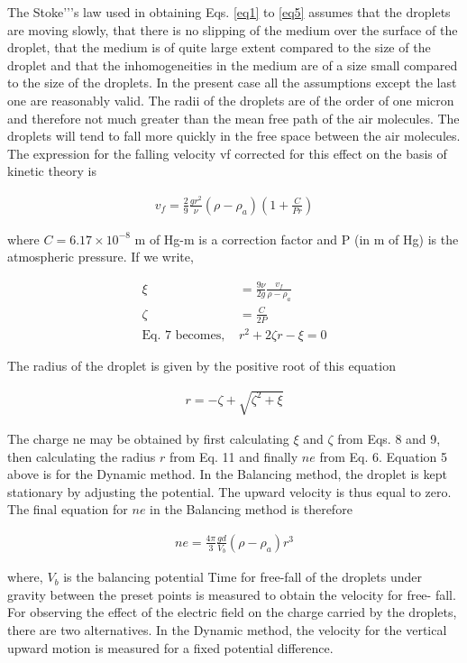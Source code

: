 The Stoke'’'s law used in obtaining Eqs. \ref{eq1} to \ref{eq5} assumes that the droplets are moving slowly, that there is no
slipping of the medium over the surface of the droplet,
that the medium is of quite large extent compared to
the size of the droplet and that the inhomogeneities in
the medium are of a size small compared to the size of
the droplets. In the present case all the assumptions
except the last one are reasonably valid. The radii of
the droplets are of the order of one micron and therefore not much greater than the mean free path of the air
molecules. The droplets will tend to fall more quickly in
the free space between the air molecules. The expression
for the falling velocity vf corrected for this effect on the
basis of kinetic theory is

\begin{align} \label{eq6}
    v_f = \frac{2}{9}\frac{gr^2}{\nu}(\rho-\rho_a)\left(1+\frac{C}{Pr}\right)
\end{align}
 
where $C = 6.17 \times 10^{-8}$ m of Hg-m is a correction factor and P (in m of Hg) is the atmospheric pressure. If we write,

\begin{align}
    \xi &= \frac{9\nu}{2g}\frac{v_f}{\rho-\rho_a}\\
    \zeta &= \frac{C}{2P}\\
    \text{Eq. 7 becomes, } &r^2 + 2\zeta r - \xi = 0
\end{align}

The radius of the droplet is given by the positive root of this equation

\begin{align}
    r = -\zeta + \sqrt{\zeta^2+\xi}
\end{align}

The charge ne may be obtained by first calculating $\xi$ and
$\zeta$ from Eqs. 8 and 9, then calculating the radius $r$ from Eq. 11 and finally $ne$ from Eq. 6. Equation 5 above is for the Dynamic method. In the Balancing
method, the droplet is kept stationary by adjusting the
potential. The upward velocity is thus equal to zero. The
final equation for $ne$ in the Balancing method is therefore

\begin{align}
    \boxed{ne = \frac{4\pi}{3}\frac{gd}{V_b}(\rho-\rho_a)r^3}
\end{align}

where, $V_b$ is the balancing potential Time for free-fall of
the droplets under gravity between the preset points is
measured to obtain the velocity for free- fall. For observing the effect of the electric field on the charge carried by
the droplets, there are two alternatives. In the Dynamic
method, the velocity for the vertical upward motion is
measured for a fixed potential difference.

